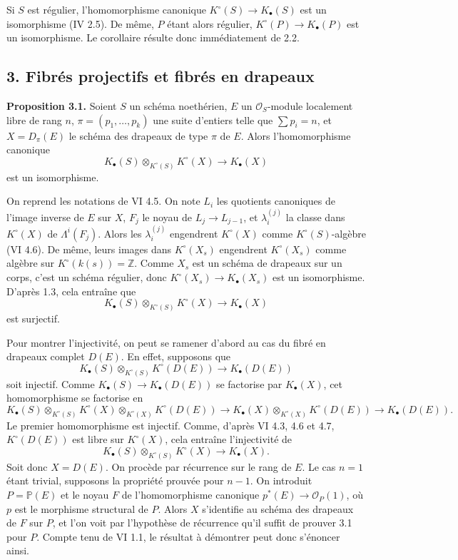 \documentclass[11pt]{article}
\begin{document}
Si $S$ est régulier, l'homomorphisme canonique $K^\circ(S)\to K_\bullet(S)$ est un isomorphisme (IV 2.5). De même, $P$ étant alors régulier, $K^\circ(P)\to K_\bullet(P)$ est un isomorphisme. Le corollaire résulte donc immédiatement de 2.2.

\subsection*{3. Fibrés projectifs et fibrés en drapeaux}

\textbf{Proposition 3.1.} Soient $S$ un schéma noethérien, $E$ un $\mathcal O_S$-module localement libre de rang $n$, $\pi=(p_1,\ldots,p_k)$ une suite d'entiers telle que $\sum p_i=n$, et $X=D_\pi(E)$ le schéma des drapeaux de type $\pi$ de $E$. Alors l'homomorphisme canonique
\[
K_\bullet(S)\otimes_{K^\circ(S)}K^\circ(X)\longrightarrow K_\bullet(X)
\]
est un isomorphisme.

On reprend les notations de VI 4.5. On note $L_i$ les quotients canoniques de l'image inverse de $E$ sur $X$, $F_j$ le noyau de $L_j\to L_{j-1}$, et $\lambda_i^{(j)}$ la classe dans $K^\circ(X)$ de $\Lambda^i(F_j)$. Alors les $\lambda_i^{(j)}$ engendrent $K^\circ(X)$ comme $K^\circ(S)$-algèbre (VI 4.6). De même, leurs images dans $K^\circ(X_s)$ engendrent $K^\circ(X_s)$ comme algèbre sur $K^\circ(k(s))=\mathbb Z$. Comme $X_s$ est un schéma de drapeaux sur un corps, c'est un schéma régulier, donc $K^\circ(X_s)\to K_\bullet(X_s)$ est un isomorphisme. D'après 1.3, cela entraîne que
\[
K_\bullet(S)\otimes_{K^\circ(S)}K^\circ(X)\longrightarrow K_\bullet(X)
\]
est surjectif.

Pour montrer l'injectivité, on peut se ramener d'abord au cas du fibré en drapeaux complet $D(E)$. En effet, supposons que
\[
K_\bullet(S)\otimes_{K^\circ(S)}K^\circ(D(E))\longrightarrow K_\bullet(D(E))
\]
soit injectif. Comme $K_\bullet(S)\to K_\bullet(D(E))$ se factorise par $K_\bullet(X)$, cet homomorphisme se factorise en
\[
K_\bullet(S)\otimes_{K^\circ(S)}K^\circ(X)\otimes_{K^\circ(X)}K^\circ(D(E))
\longrightarrow K_\bullet(X)\otimes_{K^\circ(X)}K^\circ(D(E))
\longrightarrow K_\bullet(D(E)).
\]
Le premier homomorphisme est injectif. Comme, d'après VI 4.3, 4.6 et 4.7, $K^\circ(D(E))$ est libre sur $K^\circ(X)$, cela entraîne l'injectivité de
\[
K_\bullet(S)\otimes_{K^\circ(S)}K^\circ(X)\to K_\bullet(X).
\]
Soit donc $X=D(E)$. On procède par récurrence sur le rang de $E$. Le cas $n=1$ étant trivial, supposons la propriété prouvée pour $n-1$. On introduit $P=\mathbb P(E)$ et le noyau $F$ de l'homomorphisme canonique $p^*(E)\to \mathcal O_P(1)$, où $p$ est le morphisme structural de $P$. Alors $X$ s'identifie au schéma des drapeaux de $F$ sur $P$, et l'on voit par l'hypothèse de récurrence qu'il suffit de prouver 3.1 pour $P$. Compte tenu de VI 1.1, le résultat à démontrer peut donc s'énoncer ainsi.
\end{document}

